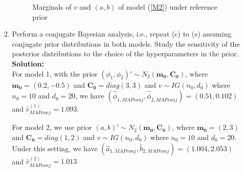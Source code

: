 \documentclass[12pt]{article}\usepackage[]{graphicx}\usepackage[]{color}
\newenvironment{knitrout}{}{} %
\begin{document}
\begin{enumerate}
\begin{enumerate}
\begin{knitrout}
\begin{figure}[h]
{\centering {}

}

\caption[Marginals of $v$ and $(a, b)$ of model (\ref{M2}) under reference prior]{Marginals of $v$ and $(a, b)$ of model (\ref{M2}) under reference prior}\label{fig:Q4e2}
\end{figure}


\end{knitrout}
		
		\item Perform a conjugate Bayesian analysis, i.e., repeat (c) to (e) assuming conjugate prior distributions in both models. Study the sensitivity of the posterior distributions to the choice of the hyperparameters in the prior.\\
		\textbf{Solution:}\\


		For model 1, with the prior $(\phi_1, \phi_2)' \sim N_2(\mathbf{m_0}, \mathbf{C_0})$, where $\mathbf{m_0} = (0.2, -0.5)$ and $\mathbf{C_0} = diag(3, 3)$ and $v \sim IG(n_0, d_0)$ where $n_0 = 10$ and $d_0 = 20$, we have $(\hat{\phi}_{1, MAPconj}, \hat{\phi}_{2, MAPconj}) = (0.51, 0.102)$ and $\hat{v} _{MAPconj}^{(1)} = 1.093$.
		
		For model 2, we use prior $(a, b)' \sim N_2(\mathbf{m_0}, \mathbf{C_0})$, where $\mathbf{m_0} = (2, 3)$ and $\mathbf{C_0} = diag(1, 2)$ and $v \sim IG(n_0, d_0)$ where $n_0 = 10$ and $d_0 = 20$. Under this setting, we have $(\hat{a}_{1, MAPconj}, \hat{b}_{2, MAPconj}) = (1.004, 2.053)$ and $\hat{v} _{MAPconj}^{(2)} = 1.013$
		

\end{enumerate}
\end{enumerate}
\end{document}
